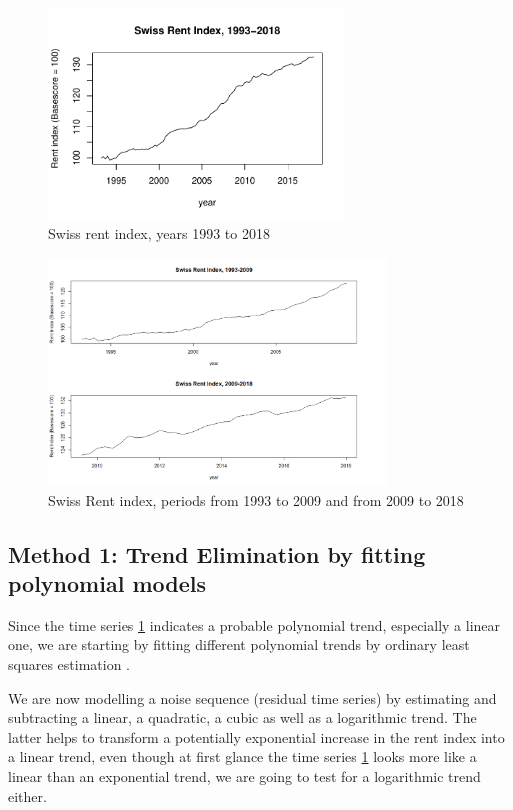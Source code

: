 \documentclass[11pt,a4paper]{article}
\begin{document}
\begin{figure}
    \centering
    \includegraphics[width=0.7\textwidth]{indiceloyers_timeseries}
    \caption{Swiss rent index, years 1993 to 2018}
    \label{fig:indiceloyers_timeseries}
\end{figure}
 
\begin{figure}
    \centering
    \includegraphics[width=0.8\textwidth]{indiceloyers_test_train}
    \caption{Swiss Rent index, periods from 1993 to 2009 and from 2009 to 2018}
    \label{fig:indiceloyers_test_train}
\end{figure}


\subsection{Method 1: Trend Elimination by fitting polynomial models}

Since the time series \ref{fig:indiceloyers_timeseries} indicates a probable polynomial trend, especially a linear one, we are starting by fitting different polynomial trends by ordinary least squares estimation \cite[p.~11]{htf09}.

We are now modelling a noise sequence (residual time series) by estimating and subtracting a linear, a quadratic, a cubic as well as a logarithmic trend.
The latter  helps to transform a potentially exponential increase in the rent index into a linear trend, even though at first glance the time series \cref{fig:indiceloyers_timeseries} looks more like a linear than an exponential trend, we are going to test for a logarithmic trend either.
\end{document}
